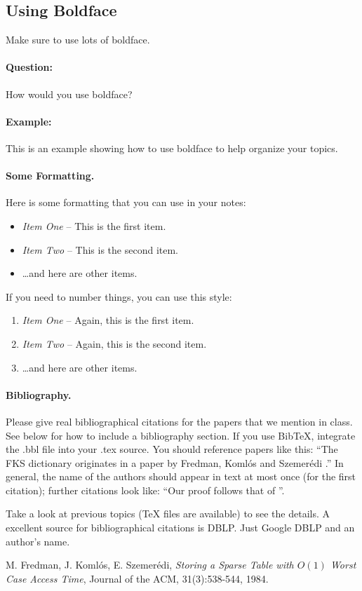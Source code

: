 \documentclass[11pt]{article}
\begin{document}
\subsection{Using Boldface}
Make sure to use lots of boldface.

\paragraph{Question:}
How would you use boldface?

\paragraph{Example:}
This is an example showing how to use boldface to 
help organize your topics.


\paragraph{Some Formatting.}
Here is some formatting that you can use in your notes:
\begin{itemize}
\item {\em Item One} -- This is the first item.
\item {\em Item Two} -- This is the second item.
\item \dots and here are other items.
\end{itemize}

If you need to number things, you can use this style:
\begin{enumerate}
\item {\em Item One} -- Again, this is the first item.
\item {\em Item Two} -- Again, this is the second item.
\item \dots and here are other items.
\end{enumerate}

\paragraph{Bibliography.}
Please give real bibliographical citations for the papers that we
mention in class. See below for how to include a bibliography section.
If you use BibTeX, integrate the .bbl file into your .tex
source. You should reference papers like this: ``The FKS
dictionary originates in a paper by Fredman, Koml\'{o}s and
Szemer\'{e}di \cite{fks}.'' In general, the name of the authors should
appear in text at most once (for the first citation); further
citations look like: ``Our proof follows that of \cite{fks}''.

Take a look at previous topics (TeX files are available) to see the
details. A excellent source for bibliographical citations is
DBLP. Just Google DBLP and an author's name.


%


\begin{thebibliography}{77}

M. Fredman, J. Koml\'{o}s, E. Szemer\'{e}di,
\emph{Storing a Sparse Table with $O(1)$ Worst Case Access Time},
Journal of the ACM, 31(3):538-544, 1984.

\end{thebibliography}
\end{document}

